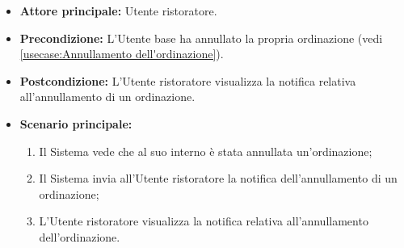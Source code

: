 \label{usecase:Visualizzazione notifica annullamento ordine}
\begin{itemize}
	\item \textbf{Attore principale:} Utente ristoratore.

	\item \textbf{Precondizione:} L'Utente base ha annullato la propria ordinazione (vedi \autoref{usecase:Annullamento dell'ordinazione}).

	\item \textbf{Postcondizione:} L'Utente ristoratore visualizza la notifica relativa all'annullamento di un ordinazione.

	\item \textbf{Scenario principale:}
	      \begin{enumerate}
		      \item Il Sistema vede che al suo interno è stata annullata un'ordinazione;
		      \item Il Sistema invia all'Utente ristoratore la notifica dell'annullamento di un ordinazione;
		      \item L'Utente ristoratore visualizza la notifica relativa all'annullamento dell'ordinazione.
	      \end{enumerate}
\end{itemize}
